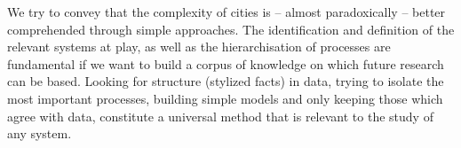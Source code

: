 

We try to convey that the complexity of cities is -- almost paradoxically --
better comprehended through simple approaches. The identification and definition
of the relevant systems at play, as well as the hierarchisation of processes are
fundamental if we want to build a corpus of knowledge on which future research
can be based.  Looking for structure (stylized facts) in data, trying to isolate
the most important processes, building simple models and only keeping those
which agree with data, constitute a universal method that is relevant to the
study of any system.


\endgroup			

\vfill
